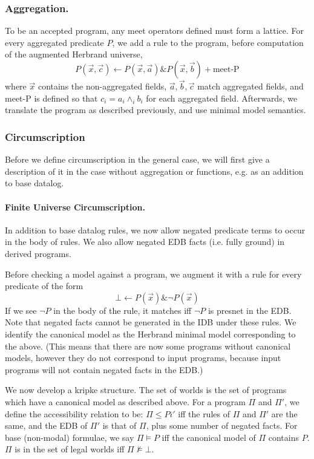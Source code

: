 \subsubsection{Aggregation.}
To be an accepted program, any meet operators defined must form a lattice.
For every aggregated predicate $P$, we add a rule to the program, before computation of the augmented Herbrand universe,
\[
	P(\vec{x}, \vec{c}) \leftarrow P(\vec{x}, \vec{a}) \& P(\vec{x}, \vec{b}) + \textrm{meet-P}
\]
where $\vec{x}$ contains the non-aggregated fields, $\vec{a}, \vec{b}, \vec{c}$ match aggregated fields, and meet-P is defined so that $c_i = a_i \wedge_i b_i$ for each aggregated field.
Afterwards, we translate the program as described previously, and use minimal model semantics.

\subsubsection{Circumscription}
Before we define circumscription in the general case, we will first give a description of it in the case without aggregation or functions, e.g. as an addition to base datalog.

\paragraph{Finite Universe Circumscription.}
In addition to base datalog rules, we now allow negated predicate terms to occur in the body of rules.
We also allow negated EDB facts (i.e. fully ground) in derived programs.

Before checking a model against a program, we augment it with a rule for every predicate of the form
\[
	\bot \leftarrow P(\vec{x}) \& \neg P(\vec{x})
\]
If we see $\neg P$ in the body of the rule, it matches iff $\neg P$ is presnet in the EDB.
Note that negated facts cannot be generated in the IDB under these rules.
We identify the canonical model as the Herbrand minimal model corresponding to the above.
(This means that there are now some programs without canonical models, however they do not correspond to input programs, because input programs will not contain negated facts in the EDB.)

We now develop a kripke structure.
The set of worlds is the set of programs which have a canonical model as described above.
For a program $\Pi$ and $\Pi'$, we define the accessibility relation to be: $\Pi \leq Pi'$ iff the rules of $\Pi$ and $\Pi'$ are the same, and the EDB of $\Pi'$ is that of $\Pi$, plus some number of negated facts.
For base (non-modal) formulae, we say $\Pi \models P$ iff the canonical model of $\Pi$ contains $P$.
$\Pi$ is in the set of legal worlds iff $\Pi \not \models \bot$.

